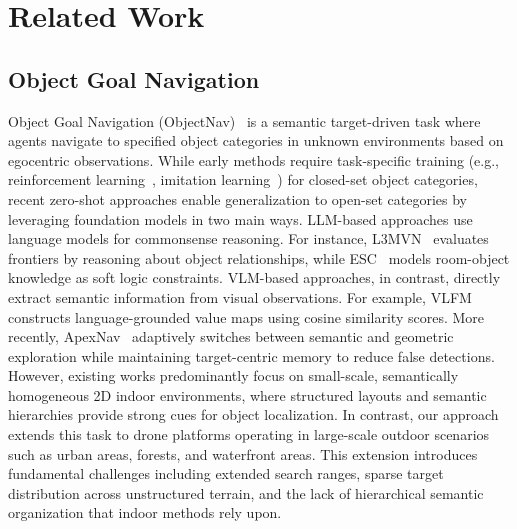 \vspace{-10pt}
\section{Related Work}

\subsection{Object Goal Navigation}
Object Goal Navigation (ObjectNav)~\cite{batra2020objectnav} is a semantic target-driven task where agents navigate to specified object categories in unknown environments based on egocentric observations.
While early methods require task-specific training (e.g., reinforcement learning~\cite{ye2021auxiliary,chang2020semantic,deitke2022procthor,gireesh2022object}, imitation learning~\cite{ramrakhya2023pirlnav}) for closed-set object categories, recent zero-shot approaches enable generalization to open-set categories by leveraging foundation models in two main ways.
LLM-based approaches use language models for commonsense reasoning. For instance, L3MVN~\cite{yu2023l3mvn} evaluates frontiers by reasoning about object relationships, while ESC~\cite{zhou2023esc} models room-object knowledge as soft logic constraints. 
VLM-based approaches, in contrast, directly extract semantic information from visual observations. For example, VLFM~\cite{yokoyama2024vlfm} constructs language-grounded value maps using cosine similarity scores. More recently, ApexNav~\cite{zhang2025apexnav} adaptively switches between semantic and geometric exploration while maintaining target-centric memory to reduce false detections.
However, existing works predominantly focus on small-scale, semantically homogeneous 2D indoor environments, where structured layouts and semantic hierarchies provide strong cues for object localization. In contrast, our approach extends this task to drone platforms operating in large-scale outdoor scenarios such as urban areas, forests, and waterfront areas. This extension introduces fundamental challenges including extended search ranges, sparse target distribution across unstructured terrain, and the lack of hierarchical semantic organization that indoor methods rely upon. 
